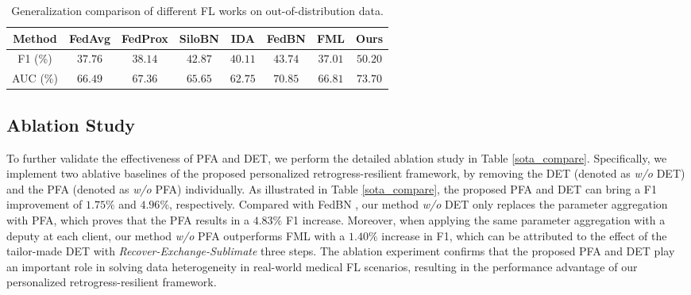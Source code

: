 \documentclass[runningheads]{llncs}
\begin{document}
\begin{table}[tb]
\centering
\caption{Generalization comparison of different FL works on out-of-distribution data.}
\centering
\renewcommand\arraystretch{1.1}
\setlength{\tabcolsep}{2.9pt}
\begin{tabular}{c|c c c c c c|c}
    \toprule[1pt]
    \multirow{1}{*}{Method} & \multicolumn{1}{c}{FedAvg\cite{fedavg}} & \multicolumn{1}{c}{FedProx\cite{fedprox}}& \multicolumn{1}{c}{SiloBN\cite{andreux2020siloed}}& \multicolumn{1}{c}{IDA\cite{yeganeh2020inverse}}& \multicolumn{1}{c}{FedBN\cite{li2021fedbn}}& \multicolumn{1}{c|}{FML\cite{federated_mutual}}& \multicolumn{1}{c}{Ours}\\ 
    \hline
    F1 (\%)  & $37.76$ & $38.14$ &  $42.87$ & $40.11$ & $43.74$ &  $37.01$ & $\bm{50.20}$ \\
    AUC (\%) & $66.49$ &  $67.36$ & $65.65$ & $62.75$ &  $70.85$ &  $66.81$ & $\bm{73.70}$ \\         
    \bottomrule[1pt]
\end{tabular}
\label{out-of-distribution}
\end{table}

\subsection{Ablation Study}
To further validate the effectiveness of PFA and DET, we perform the detailed ablation study in Table \ref{sota_compare}. Specifically, we implement two ablative baselines of the proposed personalized retrogress-resilient framework, by removing the DET (denoted as \textit{w/o} DET) and the PFA (denoted as \textit{w/o} PFA) individually. As illustrated in Table \ref{sota_compare}, the proposed PFA and DET can bring a F1 improvement of $1.75\%$ and $4.96\%$, respectively. Compared with FedBN \cite{li2021fedbn}, our method \textit{w/o} DET only replaces the parameter aggregation with PFA, which proves that the PFA results in a $4.83\%$ F1 increase. Moreover, when applying the same parameter aggregation with a deputy at each client, our method \textit{w/o} PFA outperforms FML \cite{federated_mutual} with a $1.40\%$ increase in F1, which can be attributed to the effect of the tailor-made DET with \textit{Recover-Exchange-Sublimate} three steps. The ablation experiment confirms that the proposed PFA and DET play an important role in solving data heterogeneity in real-world medical FL scenarios, resulting in the performance advantage of our personalized retrogress-resilient framework. 
\end{document}
